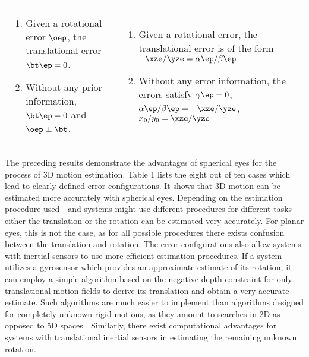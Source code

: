 \documentclass[10pt,twocolumn]{article}
\begin{document}
\begin{table*}[htbp]
\begin{tabular}{p{5cm}p{5.5cm}p{5.5cm}}
\begin{enumerate}
    \item Given a rotational error $\oep$, the translational error $\bt\ep
      = 0$.
    \item Without any prior information, $\bt\ep = 0$ and $\oep \perp
      \bt$.
    \end{enumerate}
    & \begin{enumerate}\renewcommand{\labelenumi}{{\small (\alph{enumi})}}
  \item Given a rotational error, the translational error is
    of the form ${-\xze}/{\yze} = {\alpha\ep}/{\beta\ep}$
  \item Without any error information, the errors satisfy $\gamma\ep =
    0$, ${\alpha\ep}/{\beta\ep} = {-\xze}/{\yze}$, ${x_0}/{y_0} =
    {\xze}/{\yze}$
  \end{enumerate}\\\cline{1-3}
\end{tabular}
\label{eyetable}
\end{table*}

\label{eyesfromeyes}
The preceding results demonstrate the advantages of spherical eyes for
the process of 3D motion estimation. Table 1 lists the
eight out of ten cases which lead to clearly defined error
configurations. It shows that 3D motion can be estimated more
accurately with spherical eyes. Depending on the estimation procedure
used---and systems might use different procedures for different
tasks---either the translation or the rotation can be estimated very
accurately. For planar eyes, this is not the case, as for all possible
procedures there exists confusion between the translation and
rotation. The error configurations also allow systems with inertial
sensors to use more efficient estimation procedures. If a system
utilizes a gyrosensor which provides an approximate estimate of its
rotation, it can employ a simple algorithm based on the negative depth
constraint for only translational motion fields to derive its
translation and obtain a very accurate estimate. Such algorithms are
much easier to implement than algorithms designed for completely
unknown rigid motions, as they amount to searches in 2D as opposed to
5D spaces \cite{science95}. Similarly, there exist computational
advantages for systems with translational inertial sensors in
estimating the remaining unknown rotation.
\end{document}
